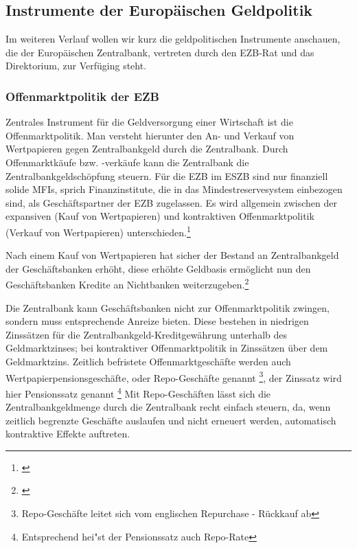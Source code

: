 \documentclass[
        onecolumn,
        a4paper,
        abstracton,
        parskip=half
        ,final
        ]{scrartcl}
\begin{document}
\subsection{Instrumente der Europ{\"a}ischen Geldpolitik}  %

	Im weiteren Verlauf wollen wir kurz die geldpolitischen Instrumente anschauen, die der Europ{\"a}ischen Zentralbank, vertreten durch den EZB-Rat und das Direktorium, zur Verf{\"u}ging steht.

\subsubsection{Offenmarktpolitik der EZB}  %



Zentrales Instrument f{\"u}r die Geldversorgung einer Wirtschaft ist die Offenmarktpolitik. Man versteht hierunter den An- und Verkauf von Wertpapieren gegen Zentralbankgeld durch die Zentralbank.
Durch Offenmarktk{\"a}ufe bzw. -verk{\"a}ufe kann die Zentralbank die Zentralbankgeldsch{\"o}pfung steuern. F{\"u}r die EZB im ESZB sind nur finanziell solide MFIs, sprich Finanzinstitute, die in das Mindestreservesystem einbezogen sind, als Gesch{\"a}ftspartner der EZB zugelassen. Es wird allgemein zwischen der expansiven (Kauf von Wertpapieren) und kontraktiven Offenmarktpolitik (Verkauf von Wertpapieren) unterschieden.\footnote[54]{\citep[S.556]{Basseler2010}}

Nach einem Kauf von Wertpapieren hat sicher der Bestand an Zentralbankgeld der Gesch{\"a}ftsbanken erh{\"o}ht, diese erh{\"o}hte Geldbasis erm{\"o}glicht nun den Gesch{\"a}ftsbanken Kredite an Nichtbanken weiterzugeben.\footnote[55]{\citep[S.557]{Basseler2010}}

Die Zentralbank kann Gesch{\"a}ftsbanken nicht zur Offenmarktpolitik zwingen, sondern muss entsprechende Anreize bieten. Diese bestehen in niedrigen Zinss{\"a}tzen f{\"u}r die Zentralbankgeld-Kreditgew{\"a}hrung unterhalb des Geldmarktzinses; bei kontraktiver Offenmarktpolitik in Zinss{\"a}tzen {\"u}ber dem Geldmarktzins.
Zeitlich befristete Offenmarktgesch{\"a}fte werden auch Wertpapierpensionsgesch{\"a}fte, oder Repo-Gesch{\"a}fte genannt \footnote[36]{Repo-Gesch{\"a}fte leitet sich vom englischen Repurchase - R{\"u}ckkauf ab}, der Zinssatz wird hier Pensionssatz genannt \footnote[37]{Entsprechend hei{"s}t der Pensionssatz auch Repo-Rate}
Mit Repo-Gesch{\"a}ften l{\"a}sst sich die Zentralbankgeldmenge durch die Zentralbank recht einfach steuern, da, wenn zeitlich begrenzte Gesch{\"a}fte auslaufen und nicht erneuert werden, automatisch kontraktive Effekte auftreten.
\end{document}
